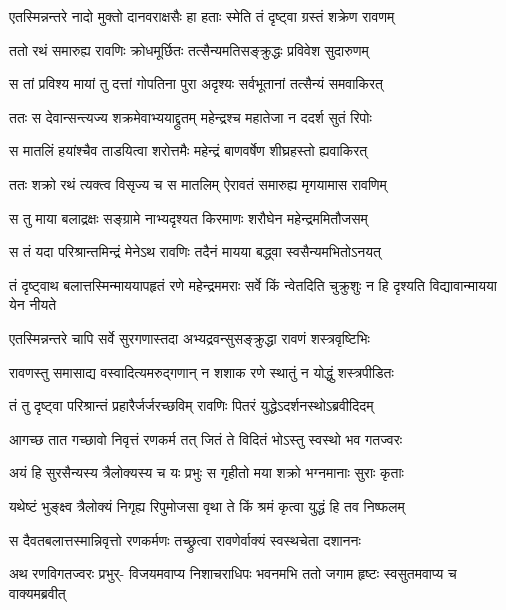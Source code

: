 \twolineshloka
{एतस्मिन्नन्तरे नादो मुक्तो दानवराक्षसैः}
{हा हताः स्मेति तं दृष्ट्वा ग्रस्तं शक्रेण रावणम्} %

\twolineshloka
{ततो रथं समारुह्य रावणिः क्रोधमूर्छितः}
{तत्सैन्यमतिसङ्क्रुद्धः प्रविवेश सुदारुणम्} %

\twolineshloka
{स तां प्रविश्य मायां तु दत्तां गोपतिना पुरा}
{अदृश्यः सर्वभूतानां तत्सैन्यं समवाकिरत्} %

\twolineshloka
{ततः स देवान्सन्त्यज्य शक्रमेवाभ्ययाद्द्रुतम्}
{महेन्द्रश्च महातेजा न ददर्श सुतं रिपोः} %

\twolineshloka
{स मातलिं हयांश्चैव ताडयित्वा शरोत्तमैः}
{महेन्द्रं बाणवर्षेण शीघ्रहस्तो ह्यवाकिरत्} %

\twolineshloka
{ततः शक्रो रथं त्यक्त्व विसृज्य च स मातलिम्}
{ऐरावतं समारुह्य मृगयामास रावणिम्} %

\twolineshloka
{स तु माया बलाद्रक्षः सङ्ग्रामे नाभ्यदृश्यत}
{किरमाणः शरौघेन महेन्द्रममितौजसम्} %

\twolineshloka
{स तं यदा परिश्रान्तमिन्द्रं मेनेऽथ रावणिः}
{तदैनं मायया बद्ध्वा स्वसैन्यमभितोऽनयत्} %

\threelineshloka
{तं दृष्ट्वाथ बलात्तस्मिन्माययापहृतं रणे}
{महेन्द्रममराः सर्वे किं न्वेतदिति चुक्रुशुः}
{न हि दृश्यति विद्यावान्मायया येन नीयते} %

\twolineshloka
{एतस्मिन्नन्तरे चापि सर्वे सुरगणास्तदा}
{अभ्यद्रवन्सुसङ्क्रुद्धा रावणं शस्त्रवृष्टिभिः} %

\twolineshloka
{रावणस्तु समासाद्य वस्वादित्यमरुद्गणान्}
{न शशाक रणे स्थातुं न योद्धुं शस्त्रपीडितः} %

\twolineshloka
{तं तु दृष्ट्वा परिश्रान्तं प्रहारैर्जर्जरच्छविम्}
{रावणिः पितरं युद्धेऽदर्शनस्थोऽब्रवीदिदम्} %

\twolineshloka
{आगच्छ तात गच्छावो निवृत्तं रणकर्म तत्}
{जितं ते विदितं भोऽस्तु स्वस्थो भव गतज्वरः} %

\twolineshloka
{अयं हि सुरसैन्यस्य त्रैलोक्यस्य च यः प्रभुः}
{स गृहीतो मया शक्रो भग्नमानाः सुराः कृताः} %

\twolineshloka
{यथेष्टं भुङ्क्ष्व त्रैलोक्यं निगृह्य रिपुमोजसा}
{वृथा ते किं श्रमं कृत्वा युद्धं हि तव निष्फलम्} %

\twolineshloka
{स दैवतबलात्तस्मान्निवृत्तो रणकर्मणः}
{तच्छ्रुत्वा रावणेर्वाक्यं स्वस्थचेता दशाननः} %

\fourlineindentedshloka
{अथ रणविगतज्वरः प्रभुर्-}
{विजयमवाप्य निशाचराधिपः}
{भवनमभि ततो जगाम हृष्टः}
{स्वसुतमवाप्य च वाक्यमब्रवीत्} %

